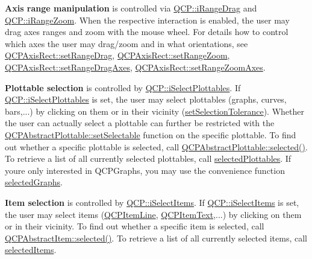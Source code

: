 {\bfseries Axis range manipulation} is controlled via \hyperlink{namespace_q_c_p_a2ad6bb6281c7c2d593d4277b44c2b037a2c4432b9aceafb94000be8d1b589ef18}{Q\+C\+P\+::i\+Range\+Drag} and \hyperlink{namespace_q_c_p_a2ad6bb6281c7c2d593d4277b44c2b037abee1e94353525a636aeaf0ba32b72e14}{Q\+C\+P\+::i\+Range\+Zoom}. When the respective interaction is enabled, the user may drag axes ranges and zoom with the mouse wheel. For details how to control which axes the user may drag/zoom and in what orientations, see \hyperlink{class_q_c_p_axis_rect_ae6aef2f7211ba6097c925dcd26008418}{Q\+C\+P\+Axis\+Rect\+::set\+Range\+Drag}, \hyperlink{class_q_c_p_axis_rect_a7960a9d222f1c31d558b064b60f86a31}{Q\+C\+P\+Axis\+Rect\+::set\+Range\+Zoom}, \hyperlink{class_q_c_p_axis_rect_a648cce336bd99daac4a5ca3e5743775d}{Q\+C\+P\+Axis\+Rect\+::set\+Range\+Drag\+Axes}, \hyperlink{class_q_c_p_axis_rect_a9442cca2aa358405f39a64d51eca13d2}{Q\+C\+P\+Axis\+Rect\+::set\+Range\+Zoom\+Axes}.

{\bfseries Plottable selection} is controlled by \hyperlink{namespace_q_c_p_a2ad6bb6281c7c2d593d4277b44c2b037a67148c8227b4155eca49135fc274c7ec}{Q\+C\+P\+::i\+Select\+Plottables}. If \hyperlink{namespace_q_c_p_a2ad6bb6281c7c2d593d4277b44c2b037a67148c8227b4155eca49135fc274c7ec}{Q\+C\+P\+::i\+Select\+Plottables} is set, the user may select plottables (graphs, curves, bars,...) by clicking on them or in their vicinity (\hyperlink{class_q_custom_plot_a4dc31241d7b09680950e19e5f971ed93}{set\+Selection\+Tolerance}). Whether the user can actually select a plottable can further be restricted with the \hyperlink{class_q_c_p_abstract_plottable_a22c69299eb5569e0f6bf084877a37dc4}{Q\+C\+P\+Abstract\+Plottable\+::set\+Selectable} function on the specific plottable. To find out whether a specific plottable is selected, call \hyperlink{class_q_c_p_abstract_plottable_ab901903adcb0e29467d63de72340ab29}{Q\+C\+P\+Abstract\+Plottable\+::selected()}. To retrieve a list of all currently selected plottables, call \hyperlink{class_q_custom_plot_a6721b8c689bb7f2f400987e580508fe8}{selected\+Plottables}. If you\textquotesingle{}re only interested in Q\+C\+P\+Graphs, you may use the convenience function \hyperlink{class_q_custom_plot_ad2a0493bdd01e7aa99a4209ae3a5b67b}{selected\+Graphs}.

{\bfseries Item selection} is controlled by \hyperlink{namespace_q_c_p_a2ad6bb6281c7c2d593d4277b44c2b037aea2f7c105d674e76d9b187b02ef29260}{Q\+C\+P\+::i\+Select\+Items}. If \hyperlink{namespace_q_c_p_a2ad6bb6281c7c2d593d4277b44c2b037aea2f7c105d674e76d9b187b02ef29260}{Q\+C\+P\+::i\+Select\+Items} is set, the user may select items (\hyperlink{class_q_c_p_item_line}{Q\+C\+P\+Item\+Line}, \hyperlink{class_q_c_p_item_text}{Q\+C\+P\+Item\+Text},...) by clicking on them or in their vicinity. To find out whether a specific item is selected, call \hyperlink{class_q_c_p_abstract_item_a225865808640d8d9a7dd19f09a2e93f2}{Q\+C\+P\+Abstract\+Item\+::selected()}. To retrieve a list of all currently selected items, call \hyperlink{class_q_custom_plot_a1a48b13547e2d9ac5cd6927516f47a2e}{selected\+Items}.


